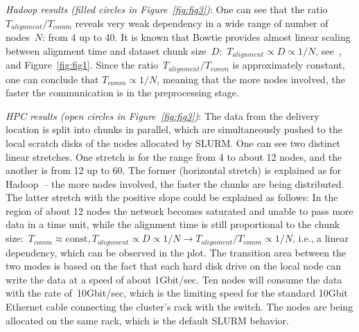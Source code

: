 \documentclass[10pt]{article}
\newcommand{\COMMENT}[1]{{\color{red} #1 }}
\begin{document}

\textit{Hadoop results (filled circles in Figure~\ref{fig:fig3})}: One can see that the ratio~$T_{alignment}/T_{comm}$ reveals very weak dependency in a wide range of number of nodes~$N$: from 4 up to 40. It is known that Bowtie provides almost linear scaling between alignment time and dataset chunk size~$D$:~$T_{alignment}\propto  D\propto 1/N$, see~\cite{Langmead:2009uq}, and Figure~\ref{fig:fig1}. Since the ratio~$T_{alignment}/T_{comm}$ is approximately constant, one can conclude that $T_{comm}\propto 1/N$, meaning that the more nodes involved, the faster the communication is in the preprocessing stage.

\textit{HPC results (open circles in Figure~\ref{fig:fig3})}: The data from the delivery location is split into chunks in parallel, which are simultaneously pushed to the local scratch disks of the nodes allocated by SLURM. One can see two distinct linear stretches. One stretch is for the range from 4 to about 12 nodes, and the another is from 12 up to 60. The former (horizontal stretch) is explained as for Hadoop~-- the more nodes involved, the faster the chunks are being distributed. The latter stretch with the positive slope could be explained as follows: In the region of about 12 nodes the network becomes saturated
and unable to pass more data in a time unit, while the alignment time is still proportional to the chunk size:~$T_{comm}\approx\mbox{const}, T_{alignment}\propto D\propto 1/N \rightarrow T_{alignment}/T_{comm}\propto 1/N$, i.e., a linear dependency, which can be observed in the plot. 
The transition area between the two modes is based on the fact that each hard disk drive on the local node can write the data at a speed of about 1Gbit/sec. Ten nodes will consume the data with the rate of~10Gbit/sec, which is the limiting speed for the standard 10Gbit Ethernet cable connecting the cluster's rack with the switch. The nodes are being allocated on the same rack, which is the default SLURM behavior.
\end{document}
